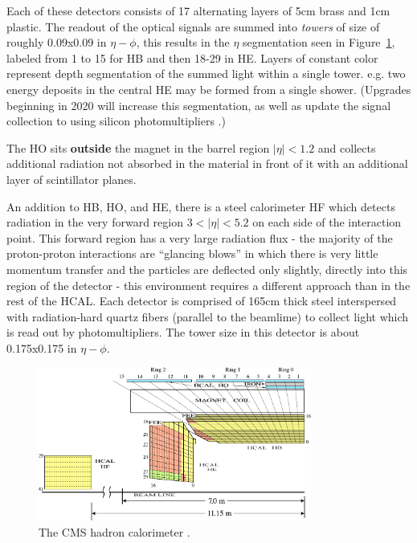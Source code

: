 Each of these detectors consists of 17 alternating layers of 5cm brass and 1cm plastic. The readout of the optical signals are summed into \textit{towers} of size of roughly 0.09x0.09 in $\eta-\phi$, this results in the $\eta$ segmentation seen in Figure~\ref{fig:hcal}, labeled from 1 to 15 for HB and then 18-29 in HE.  Layers of constant color represent depth segmentation of the summed light within a single tower.  e.g. two energy deposits in the central HE may be formed from a single shower. (Upgrades beginning in 2020 will increase this segmentation, as well as update the signal collection to using silicon photomultipliers  \cite{hcalupgrade}.)

The HO sits \textbf{outside} the magnet in the barrel region $|\eta|<1.2$ and collects additional radiation not absorbed in the material in front of it with an additional layer of scintillator planes.

An addition to HB, HO, and HE, there is a steel calorimeter HF which detects radiation in the very forward region $3<|\eta|<5.2$ on each side of the interaction point. This forward region has a very large radiation flux - the majority of the proton-proton interactions are ``glancing blows'' in which there is very little momentum transfer and the particles are deflected only slightly, directly into this region of the detector - this environment requires a different approach than in the rest of the HCAL. Each detector is comprised of 165cm thick steel interspersed with radiation-hard quartz fibers (parallel to the beamlime) to collect light which is read out by photomultipliers. The tower size in this detector is about 0.175x0.175 in $\eta-\phi$.

\begin{figure}
\centering
\includegraphics[width=0.8\textwidth]{figs/hcal.pdf}
\caption[The CMS hadron calorimeter.]{The CMS hadron calorimeter \cite{cosmichcal}.}
\label{fig:hcal}
\end{figure}

